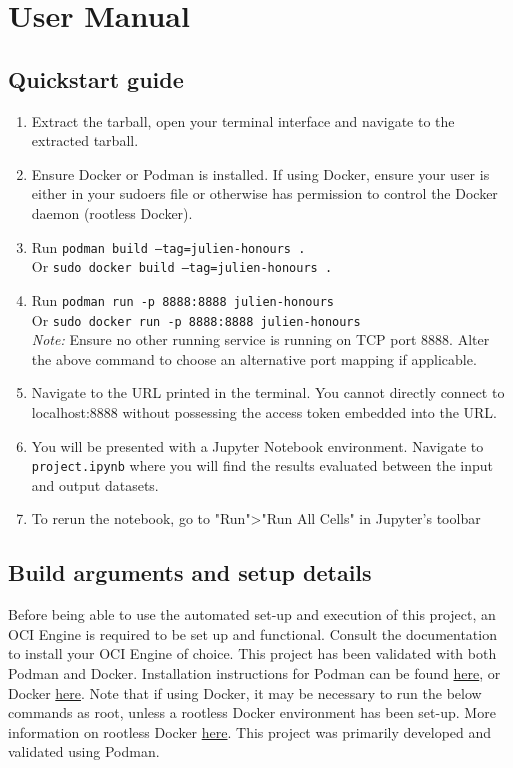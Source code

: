 \chapter{User Manual\label{chap:user_man}}

\section{Quickstart guide}
\begin{enumerate}
    \item Extract the tarball, open your terminal interface and navigate to the extracted tarball.
    \item Ensure Docker or Podman is installed. If using Docker, ensure your user is either in your sudoers file or otherwise has permission to control the Docker daemon (rootless Docker).
    \item Run \texttt{podman build --tag=julien-honours .} \\
    Or \texttt{sudo docker build --tag=julien-honours .}
    \item Run \texttt{podman run -p 8888:8888 julien-honours} \\
    Or \texttt{sudo docker run -p 8888:8888 julien-honours} \\
    \textit{Note:} Ensure no other running service is running on TCP port 8888. Alter the above command to choose an alternative port mapping if applicable.
    \item Navigate to the URL printed in the terminal. You cannot directly connect to localhost:8888 without possessing the access token embedded into the URL.
    \item You will be presented with a Jupyter Notebook environment. Navigate to \texttt{project.ipynb} where you will find the results evaluated between the input and output datasets.
    \item To rerun the notebook, go to "Run">"Run All Cells" in Jupyter's toolbar
\end{enumerate}

\section{Build arguments and setup details}
Before being able to use the automated set-up and execution of this project, an OCI Engine is required to be set up and functional. Consult the documentation to install your OCI Engine of choice. This project has been validated with both Podman and Docker. Installation instructions for Podman can be found \href{https://podman.io/docs/installation}{here},  or Docker \href{https://docs.docker.com/get-docker/}{here}. Note that if using Docker, it may be necessary to run the below commands as root, unless a rootless Docker environment has been set-up. More information on rootless Docker \href{https://docs.docker.com/engine/security/rootless/}{here}. This project was primarily developed and validated using Podman.

